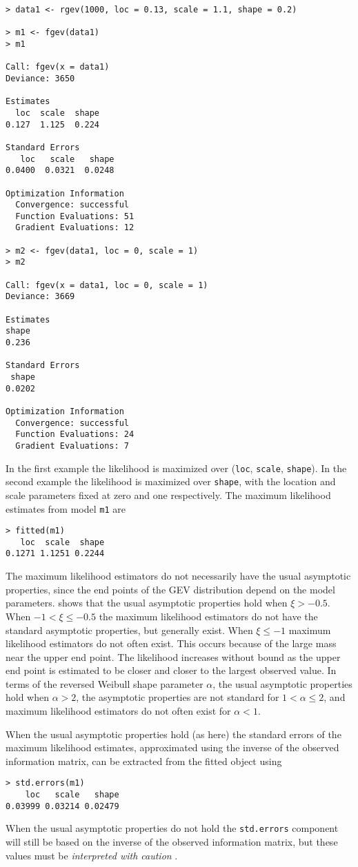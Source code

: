 \documentclass[11pt,a4paper]{article}
\begin{document}
\begin{verbatim}
> data1 <- rgev(1000, loc = 0.13, scale = 1.1, shape = 0.2)

> m1 <- fgev(data1)
> m1

Call: fgev(x = data1) 
Deviance: 3650 

Estimates
  loc  scale  shape  
0.127  1.125  0.224  

Standard Errors
   loc   scale   shape  
0.0400  0.0321  0.0248  

Optimization Information
  Convergence: successful 
  Function Evaluations: 51 
  Gradient Evaluations: 12 

> m2 <- fgev(data1, loc = 0, scale = 1)
> m2

Call: fgev(x = data1, loc = 0, scale = 1) 
Deviance: 3669 

Estimates
shape  
0.236  

Standard Errors
 shape  
0.0202  

Optimization Information
  Convergence: successful 
  Function Evaluations: 24 
  Gradient Evaluations: 7 
\end{verbatim}
In the first example the likelihood is maximized over (\verb+loc+, \verb+scale+, \verb+shape+).
In the second example the likelihood is maximized over \verb+shape+, with the location and scale parameters fixed at zero and one respectively.
The maximum likelihood estimates from model \verb+m1+ are
\begin{verbatim}
> fitted(m1)
   loc  scale  shape 
0.1271 1.1251 0.2244 
\end{verbatim}
The maximum likelihood estimators do not necessarily have the usual asymptotic properties, since the end points of the GEV distribution depend on the model parameters. \citet{smit85} shows that the usual asymptotic properties hold when $\xi > -0.5$.
When $-1 < \xi \leq -0.5$ the maximum likelihood estimators do not have the standard asymptotic properties, but generally exist.
When $\xi \leq -1$ maximum likelihood estimators do not often exist.
This occurs because of the large mass near the upper end point. 
The likelihood increases without bound as the upper end point is estimated to be closer and closer to the largest observed value.
In terms of the reversed Weibull shape parameter $\alpha$, the usual asymptotic properties hold when $\alpha>2$, the asymptotic properties are not standard for $1<\alpha\leq2$, and maximum likelihood estimators do not often exist for $\alpha<1$.

When the usual asymptotic properties hold (as here) the standard errors of the maximum likelihood estimates, approximated using the inverse of the observed information matrix, can be extracted from the fitted object using
\begin{verbatim}
> std.errors(m1)
    loc   scale   shape 
0.03999 0.03214 0.02479 
\end{verbatim}
When the usual asymptotic properties do not hold the \verb+std.errors+ component will still be based on the inverse of the observed information matrix, but these values must be \emph{interpreted with caution} \citep{smit85}.
\end{document}
